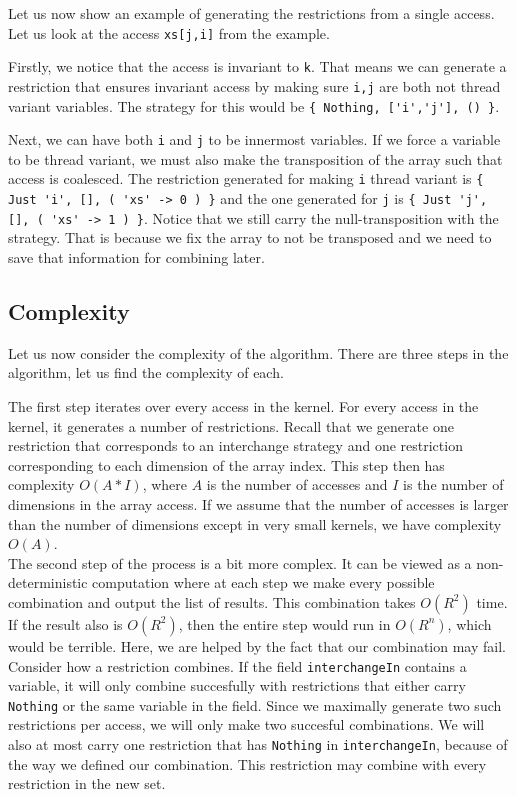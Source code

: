 \documentclass{article}
\begin{document}
Let us now show an example of generating the restrictions from a single access. Let us look at the access \verb`xs[j,i]` from the example.

Firstly, we notice that the access is invariant to \verb`k`. That means we can generate a restriction that ensures invariant access by making sure \verb`i,j`
are both not thread variant variables. The strategy for this would be \verb`{ Nothing, ['i','j'], () }`.

Next, we can have both \verb`i` and \verb`j` to be innermost variables. If we force a variable to be thread variant, we must also make the transposition of the
array such that access is coalesced. The restriction generated for making \verb`i` thread variant is \verb`{ Just 'i', [], ( 'xs' -> 0 ) }` and the one generated
for \verb`j` is \verb`{ Just 'j', [], ( 'xs' -> 1 ) }`. Notice that we still carry the null-transposition with the strategy. That is because we fix the array to
  not be transposed and we need to save that information for combining later.

\subsection{Complexity}

Let us now consider the complexity of the algorithm. There are three steps in the algorithm, let us find the complexity of each.

The first step iterates over every access in the kernel. For every access in the kernel, it generates a number of restrictions. Recall that we generate one
restriction that corresponds to an interchange strategy and one restriction corresponding to each dimension of the array index. This step then has complexity
$O(A*I)$, where $A$ is the number of accesses and $I$ is the number of dimensions in the array access. If we assume that the number of accesses is larger than
the number of dimensions except in very small kernels, we have complexity $O(A)$.\\

The second step of the process is a bit more complex. It can be viewed as a non-deterministic computation where at each step we make every possible combination
and output the list of results. This combination takes $O(R^2)$ time. If the result also is $O(R^2)$, then the entire step would run in $O(R^n)$, which would be
terrible. Here, we are helped by the fact that our combination may fail. Consider how a restriction combines. If the field \verb`interchangeIn` contains a
variable, it will only combine succesfully with restrictions that either carry \verb`Nothing` or the same variable in the field. Since we maximally generate two
such restrictions per access, we will only make two succesful combinations. We will also at most carry one restriction that has \verb`Nothing` in
\verb`interchangeIn`, because of the way we defined our combination. This restriction may combine with every restriction in the new set.
\end{document}
